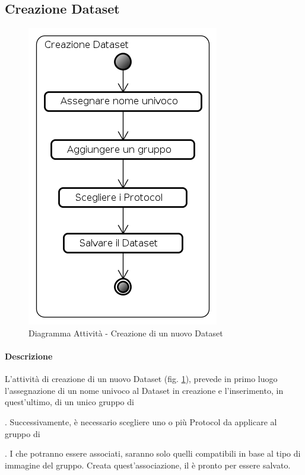 \subsection{Creazione Dataset}
\label{newDataset}
\begin{figure}[!h]
	\centering
	\includegraphics[scale=0.6]{./img/Diagrammi_Attivita/Creazione_Dataset}
	\caption{Diagramma Attività - Creazione di un nuovo Dataset}
	\label{newData}
\end{figure}
\paragraph{Descrizione\\}
L'attività di creazione di un nuovo Dataset\glossario{} (fig. \ref{newData}), prevede in primo luogo l'assegnazione di un nome univoco al Dataset\glossario{} in creazione e l'inserimento, in quest'ultimo, di un unico gruppo di \subject{}. Successivamente, è necessario scegliere uno o più Protocol\glossario{} da applicare al gruppo di \subject{}. I \protocol{} che potranno essere associati, saranno solo quelli compatibili in base al tipo di immagine del gruppo. Creata quest'associazione, il \dataset{} è pronto per essere salvato.
\pagebreak

